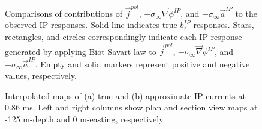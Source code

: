 \documentclass[extra,mreferee]{gji}
\newcommand{\grad}{\vec \nabla}
\newcommand{\siginf}{\sigma_\infty}
\renewcommand {\j}  { {\vec j} }
\begin{document}
\begin{figure}
  \caption{Comparisons of contributions of $\j^{pol}$, $-\siginf\grad \phi^{IP}$, and $-\siginf\vec{a}^{IP}$ to the observed IP responses. Solid line indicates true $b_z^{IP}$ responses. Stars, rectangles, and circles correspondingly indicate each IP response generated by applying Biot-Savart law to $\j^{pol}$, $-\siginf\grad \phi^{IP}$, and $-\siginf\vec{a}^{IP}$. Empty and solid markers represent positive and negative values, respectively. }
  \label{F:DecompjIPcond}
\end{figure}

\begin{figure}
  \caption{Interpolated maps of (a) true and (b) approximate IP currents at 0.86 ms. Left and right columns show plan and section view maps at -125 m-depth and 0 m-easting, respectively. }
  \label{F:IPcurrent_PlanandSec_early}
\end{figure}
\end{document}
